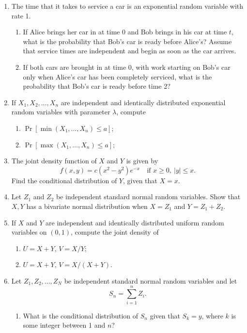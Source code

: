\documentclass[11pt,letterpaper]{article}
\begin{document}
\begin{enumerate}
    \item The time that it takes to service a car is an exponential random variable with rate 1.
    \begin{enumerate}
        \item If Alice brings her car in at time 0 and Bob brings in his car at time $t$, what is the probability that Bob's car is ready before Alice's? Assume that service times are independent and begin as soon as the car arrives.

        \item If both cars are brought in at time 0, with work starting on Bob's car only when Alice's car has been completely serviced, what is the probability that Bob's car is ready before time 2?
    \end{enumerate}

    \item If $X_1, X_2, \ldots, X_n$ are independent and identically distributed exponential random variables with parameter $\lambda$, compute
    \begin{enumerate}
        \item $\Pr[\min(X_1, \ldots, X_n) \leq a]$;
        \item $\Pr[\max(X_1, \ldots, X_n) \leq a]$;        
    \end{enumerate}

    \item The joint density function of $X$ and $Y$ is given by
    \[
        f(x,y) = c(x^2-y^2)e^{-x}\quad\text{if }x\geq 0,\ |y|\leq x.
    \]
    Find the conditional distribution of $Y$, given that $X = x$.

    \item Let $Z_1$ and $Z_2$ be independent standard normal random variables.
    Show that $X,Y$ has a bivariate normal distribution when $X = Z_1$ and $Y = Z_1+Z_2$.

    \item If $X$ and $Y$ are independent and identically distributed uniform random variables on $(0,1)$, compute the joint density of
    \begin{enumerate}
        \item $U = X+Y$, $V = X/Y$;
        \item $U = X+Y$, $V = X/(X+Y)$.
    \end{enumerate}

    \item Let $Z_1, Z_2, \ldots, Z_N$ be independent standard normal random variables and let
    \[
        S_n = \sum_{i=1}^n Z_i.
    \]
    \begin{enumerate}
        \item What is the conditional distribution of $S_n$ given that $S_k = y$, where $k$ is some integer between 1 and $n$?


\end{enumerate}
\end{enumerate}
\end{document}
